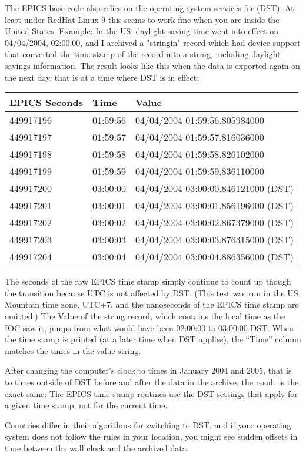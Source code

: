 The EPICS base code also relies on the operating system services for
 (DST). At least under RedHat Linux 9 this
seems to work fine when you are inside the United States.
Example: In the US, daylight saving time went into effect on
04/04/2004, 02:00:00, and I archived a "stringin" record which had
device support that converted the time stamp of the record into a string,
including daylight savings information.
The result looks like this when the data is exported again
on the next day, that is at a time where DST is in effect:

\medskip
\begin{tabular}{lll}
EPICS Seconds & Time     & Value \\
\hline
449917196     & 01:59:56 & 04/04/2004 01:59:56.805984000 \\
449917197     & 01:59:57 & 04/04/2004 01:59:57.816036000 \\
449917198     & 01:59:58 & 04/04/2004 01:59:58.826102000 \\
449917199     & 01:59:59 & 04/04/2004 01:59:59.836110000 \\
449917200     & 03:00:00 & 04/04/2004 03:00:00.846121000 (DST) \\
449917201     & 03:00:01 & 04/04/2004 03:00:01.856196000 (DST) \\
449917202     & 03:00:02 & 04/04/2004 03:00:02.867379000 (DST) \\
449917203     & 03:00:03 & 04/04/2004 03:00:03.876315000 (DST) \\
449917204     & 03:00:04 & 04/04/2004 03:00:04.886356000 (DST) 
\end{tabular}

\medskip
\noindent The seconds of the raw EPICS time stamp simply continue to count up
though the transition because UTC is not affected by DST.
(This test was run in the US Mountain time zone, UTC+7, and the
nanoseconds of the EPICS time stamp are omitted.)
The Value of the string record, which contains the local time as the
IOC saw it, jumps from what would have been 02:00:00 to 03:00:00 DST.
When the time stamp is printed (at a later time when DST applies),
the ``Time'' column matches the times in the value string.

After changing the computer's clock to times in January 2004 and 2005,
that is to times outside of DST before and after the data in the
archive, the result is the exact same:
The EPICS time stamp routines use the DST settings that apply for a
given time stamp, not for the current time.

Countries differ in their algorithms for switching to DST, and if your
operating system does not follow the rules in your location, you might
see sudden offsets in time between the wall clock and the archived
data.
